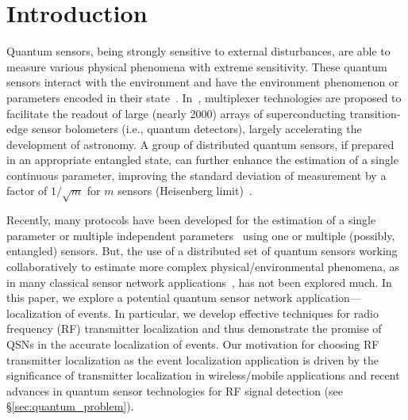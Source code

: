 \section{Introduction}

Quantum sensors, being strongly sensitive to external disturbances, are able to measure various physical phenomena with extreme sensitivity.
These quantum sensors interact with the environment and have the environment phenomenon or parameters encoded in their state~\cite{RevModPhys.quantumsensing}.
In~\cite{kaiwen1,kaiwen2}, multiplexer technologies are proposed to facilitate the readout of large (nearly 2000) 
arrays of superconducting transition-edge sensor bolometers (i.e., quantum detectors), largely accelerating the development of astronomy.
A group of distributed quantum sensors, if prepared in an appropriate entangled state, can further enhance the estimation of a single continuous parameter, improving the standard deviation of measurement by a factor of $1/\sqrt{m}$ for $m$ sensors (Heisenberg limit)~\cite{Giovannetti_2011}.

Recently, many protocols have been developed for the estimation of a single 
parameter or multiple independent parameters~\cite{Giovannetti_2011,mpe_2018} using one or multiple (possibly, entangled) sensors. 
But, the use of a distributed set of quantum sensors working collaboratively 
to estimate more complex physical/environmental phenomena, as in many classical
sensor network applications~\cite{tsn17-water, sensys10-health,mobicom03-sensor}, 
has not been explored much.
In this paper, we explore a potential quantum sensor network application--- localization of events.
In particular, we develop effective techniques 
for radio frequency (RF) transmitter localization and thus demonstrate the promise of QSNs in the accurate localization of events. Our motivation for choosing 
RF transmitter localization as the event localization 
application is driven by the significance of transmitter localization
in  wireless/mobile applications and recent advances in quantum sensor
technologies for RF signal detection (see \S\ref{sec:quantum_problem}).


